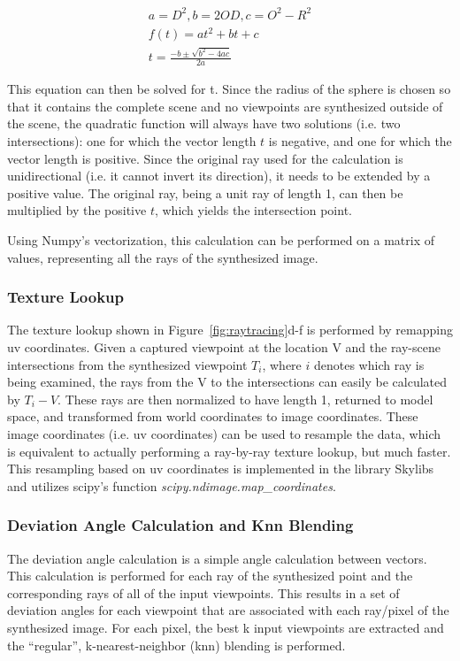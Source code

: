 \begin{align}
  a = D^2, b = 2OD, c = O^2-R^2 \nonumber \\
  f(t) = at^2 + bt + c \label{eq:quadf}\\
  t = \frac{-b \pm \sqrt{b^2 - 4ac}}{2a} \label{eq:solvequadf}
\end{align}

This equation can then be solved for t. Since the radius of the sphere is chosen so that it contains the complete scene and no viewpoints are synthesized outside of the scene, the quadratic function will always have two solutions (i.e. two intersections): one for which the vector length $t$ is negative, and one for which the vector length is positive. Since the original ray used for the calculation is unidirectional (i.e. it cannot invert its direction), it needs to be extended by a positive value. The original ray, being a unit ray of length 1, can then be multiplied by the positive $t$, which yields the intersection point. 

Using Numpy's vectorization, this calculation can be performed on a matrix of values, representing all the rays of the synthesized image.

\subsubsection{Texture Lookup}
The texture lookup shown in Figure~\ref{fig:raytracing}d-f is performed by remapping uv coordinates. Given a captured viewpoint at the location V and the ray-scene intersections from the synthesized viewpoint $T_i$, where $i$ denotes which ray is being examined, the rays from the V to the intersections can easily be calculated by $T_i-V$. These rays are then normalized to have length 1, returned to model space, and transformed from world coordinates to image coordinates. These image coordinates (i.e. uv coordinates) can be used to resample the data, which is equivalent to actually performing a ray-by-ray texture lookup, but much faster. This resampling based on uv coordinates is implemented in the library Skylibs \cite{skylibs} and utilizes scipy's function \emph{scipy.ndimage.map\_coordinates}.

\subsubsection{Deviation Angle Calculation and Knn Blending}
The deviation angle calculation is a simple angle calculation between vectors. This calculation is performed for each ray of the synthesized point and the corresponding rays of all of the input viewpoints. This results in a set of deviation angles for each viewpoint that are associated with each ray/pixel of the synthesized image. For each pixel, the best k input viewpoints are extracted and the ``regular'', k-nearest-neighbor (knn) blending is performed.

